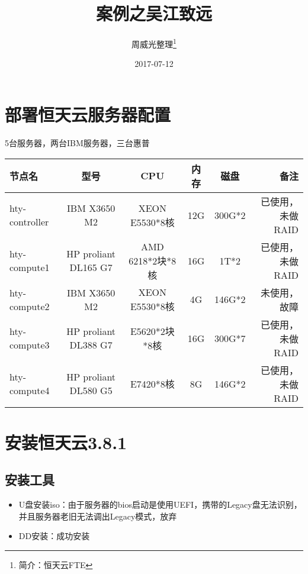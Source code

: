 \documentclass[a4paper,left=1.5cm,right=1.5cm,11pt]{article}
\title{案例之吴江致远}
\author{周威光整理\footnote{简介：恒天云FTE}}
\date{2017-07-12}
\begin{document}
\maketitle
\clearpage
\tableofcontents
\clearpage

\section{部署恒天云服务器配置}
5台服务器，两台IBM服务器，三台惠普
\begin{center}
\begin{tabular}{|l|c|c|c|c|r|}
 \hline
节点名& 型号& CPU& 内存& 磁盘 &备注\\
 \hline
hty-controller&IBM X3650 M2 & XEON E5530*8核& 12G &300G*2 & 已使用，未做RAID\\
 \hline
hty-compute1&HP proliant DL165 G7 & AMD 6218*2块*8核& 16G &1T*2 & 已使用，未做RAID\\
 \hline
hty-compute2&IBM X3650 M2 & XEON E5530*8核& 4G &146G*2 & 未使用，故障\\
 \hline
hty-compute3&HP proliant DL388 G7& E5620*2块*8核& 16G &300G*7 & 已使用，未做RAID\\
 \hline
hty-compute4&HP proliant DL580 G5 & E7420*8核& 8G &146G*2 & 已使用，未做RAID\\
 \hline
\end{tabular}
\end{center}
\section{安装恒天云3.8.1}
\subsection{安装工具}
\begin{itemize}
	\item[1.]U盘安装iso：由于服务器的bios启动是使用UEFI，携带的Legacy盘无法识别，并且服务器老旧无法调出Legacy模式，放弃
	\item[2.]DD安装：成功安装
\end{itemize}
\end{document}
